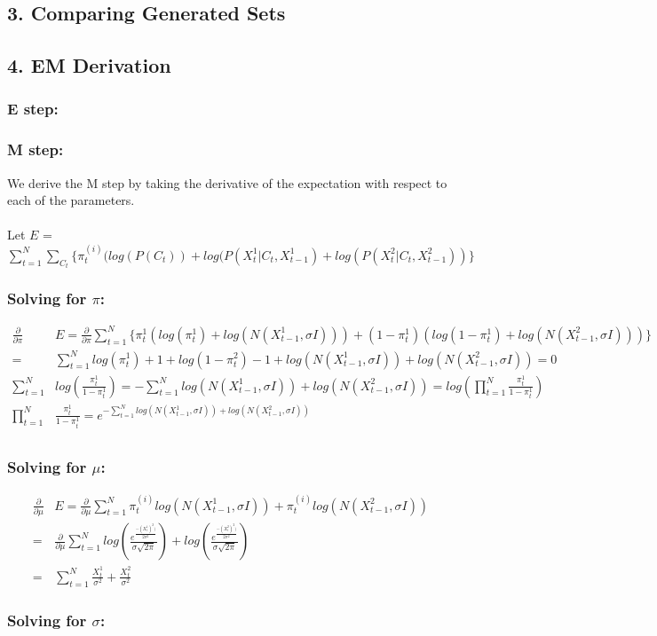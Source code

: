 \documentclass[a4paper,12pt]{article}
\begin{document}
\subsection*{3. Comparing Generated Sets}

\subsection*{4. EM Derivation}

\subsubsection*{E step:}

\subsubsection*{M step:}

We derive the M step by taking the derivative of the expectation with respect to each of the parameters. \\
\\
Let $ E $ = $ \sum_{t=1}^N \sum_{C_t} \{ \pi^{(i)}_t( log(P(C_t)) + log(P(X^1_t | C_t, X^1_{t-1}) + log(P(X^2_t | C_t, X^2_{t-1})) \} $
\subsubsection*{Solving for $ \pi $:}
\begin{align*} 
\frac{\partial}{\partial \pi}& E = \frac{\partial}{\partial \pi} \sum_{t=1}^N \{ \pi^{1}_t( log(\pi^{1}_t) + log(N(X^{1}_{t-1}, \sigma I))) + (1-\pi^{1}_t)(log(1-\pi^{1}_t) + log(N(X^{2}_{t-1}, \sigma I))) \} \\ 
=& \sum_{t=1}^N log(\pi^{1}_t) + 1 + log(1 - \pi^{2}_t) - 1 +  log(N(X^{1}_{t-1}, \sigma I)) + log(N(X^{2}_{t-1}, \sigma I)) = 0 \\
\sum_{t=1}^N & log(\frac{\pi^{1}_t}{1 - \pi^{1}_t}) = -\sum_{t=1}^N log(N(X^{1}_{t-1}, \sigma I)) + log(N(X^{2}_{t-1}, \sigma I)) = log(\prod_{t=1}^N \frac{\pi^{1}_t}{1 - \pi^{1}_t}) \\
\prod_{t=1}^N& \frac{\pi^{1}_t}{1 - \pi^{1}_t} = e^{-\sum_{t=1}^N log(N(X^{1}_{t-1}, \sigma I)) + log(N(X^{2}_{t-1}, \sigma I))}\\
\end{align*}

\subsubsection*{Solving for $ \mu $:}
\begin{align*} 
\frac{\partial}{\partial \mu}& E = \frac{\partial}{\partial \mu} \sum_{t=1}^N  \pi^{(i)}_t log(N(X^{1}_{t-1}, \sigma I)) +  \pi^{(i)}_t log(N(X^{2}_{t-1}, \sigma I))\\ 
=& \frac{\partial}{\partial \mu} \sum_{t=1}^N log(\frac{e^{\frac{-(X^1_t)^2)}{2\sigma^2} } } {\sigma \sqrt{2\pi}}) + log(\frac{e^{\frac{-(X^2_t)^2)}{2\sigma^2} } } {\sigma \sqrt{2\pi}})\\
=& \sum_{t=1}^N \frac{X^1_t}{\sigma^2} + \frac{X^2_t}{\sigma^2}
\end{align*}

\subsubsection*{Solving for $ \sigma $:}
\end{document}
